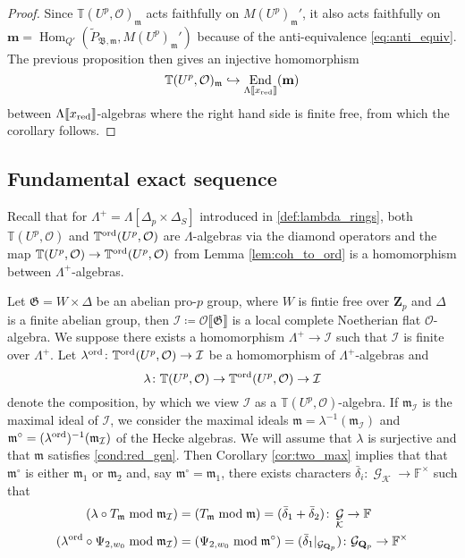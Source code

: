 \documentclass[leqno]{amsart}
\theoremstyle{definition}
\theoremstyle{remark}
\newcommand{\oo}{\mathcal{O}}
\newcommand{\fF}{\mathbb{F}} %
\newcommand{\Qp}{\mathbf{Q}_p}
\newcommand{\Zp}{\mathbf{Z}_p}
\DeclareMathOperator{\End}{End}
\DeclareMathOperator{\Hom}{Hom}
\DeclareMathOperator{\Gal}{\mathcal{G}}
\newcommand{\fm}{\mathfrak{m}}
\newcommand{\Gp}{\mathcal{G}_{\Qp}} %
\newcommand{\B}{\mathfrak B} %
\newcommand{\xx}{x_\textnormal{red}}
\newcommand{\K}{{\mathcal{K}}} %
\newcommand{\fG}{\mathfrak{G}}
\newcommand{\TT}{\mathbb{T}} %
\newcommand{\I}{\mathcal{I}} %
\newcommand{\ord}{\textnormal{ord}} %
\begin{document}
\begin{proof}
Since $\TT(U^p,\oo)_{\fm}$ acts faithfully on 
$M(U^p)_{\fm}'$, it also acts faithfully on
$\mathbf{m}=\Hom_{Q'}(\tilde{P}_{\B,\fm},M(U^p)_{\fm}')$ 
because of the anti-equivalence \eqref{eq:anti_equiv}.
The previous proposition then gives an injective homomorphism
\[
    \TT(U^p,\oo)_\fm\hookrightarrow
    \End_{\Lambda\llbracket\xx\rrbracket}(\mathbf{m})
\]
between $\Lambda\llbracket\xx\rrbracket$-algebras
where the right hand side is finite free,
from which the corollary follows.
\end{proof}

\subsection{Fundamental exact sequence}
\label{sub:fund_exact_sequence}

Recall that for $\Lambda^+=\Lambda[\Delta_p\times\Delta_S]$
introduced in \eqref{def:lambda_rings},
both $\TT(U^p,\oo)$ and $\TT^{\ord}(U^p,\oo)$
are $\Lambda$-algebras via the diamond operators
and the map 
$\TT(U^p,\oo)\to \TT^{\ord}(U^p,\oo)$
from Lemma \ref{lem:coh_to_ord}
is a homomorphism between $\Lambda^+$-algebras.


Let $\fG=W\times \Delta$ be an abelian pro-$p$ group,
where $W$ is fintie free over $\Zp$
and $\Delta$ is a finite abelian group,
then $\I\coloneqq\oo\llbracket\fG\rrbracket$
is a local complete Noetherian flat $\oo$-algebra.
We suppose there exists a homomorphism
$\Lambda^+\to \I$ such that 
$\I$ is finite over $\Lambda^+$.
Let $\lambda^{\ord}\colon 
\TT^{\ord}(U^p,\oo)\to\I$
be a homomorphism of $\Lambda^+$-algebras and
\begin{equation}
    \lambda\colon 
    \TT(U^p,\oo)\to
    \TT^{\ord}(U^p,\oo)\to\I
\end{equation}
denote the composition, by which
we view $\I$ as a $\TT(U^p,\oo)$-algebra.
If $\fm_\I$ is the maximal ideal of $\I$,
we consider the maximal ideals
$\fm=\lambda^{-1}(\fm_\I)$ 
and $\fm^\circ=(\lambda^{\ord})^{-1}(\fm_\I)$
of the Hecke algebras.
We will assume that
$\lambda$ is surjective and that 
$\fm$ satisfies \eqref{cond:red_gen}.
Then Corollary \ref{cor:two_max} implies that
that $\fm^\circ$ is either $\fm_1$ or $\fm_2$ and,
say $\fm^{\circ}=\fm_1$,
there exists characters 
$\bar{\delta}_i\colon \Gal_\K\to \fF^\times$ such that
\begin{align*}
    (\lambda\circ T_\fm\bmod \fm_\I)&=
    (T_\fm\bmod \fm)=
    (\bar{\delta}_1+\bar{\delta}_2)\colon 
    \Gal_\K\to \fF\\
    (\lambda^{\ord}\circ \Psi_{2,w_0}\bmod\fm_\I)&=
    (\Psi_{2,w_0}\bmod\fm^{\circ})=
    (\bar{\delta}_1\vert_{\Gp})\colon 
    \Gp\to \fF^\times
\end{align*}
\end{document}
